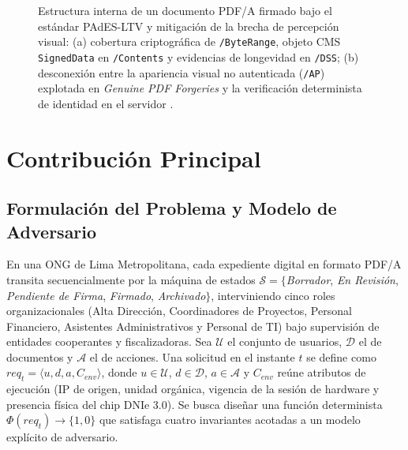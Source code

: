 \documentclass[runningheads,twocolumn]{llncs}
\begin{document}
\begin{figure}[t]
{%
}
\caption{Estructura interna de un documento PDF/A firmado bajo el estándar PAdES-LTV y mitigación de la brecha de percepción visual: (a) cobertura criptográfica de \texttt{/ByteRange}, objeto CMS \texttt{SignedData} en \texttt{/Contents} y evidencias de longevidad en \texttt{/DSS}; (b) desconexión entre la apariencia visual no autenticada (\texttt{/AP}) explotada en \textit{Genuine PDF Forgeries} y la verificación determinista de identidad en el servidor \cite{doynov2026,heher2027}.}
\label{fig:pades_ltv_structure}
\end{figure}

\section{Contribución Principal}\label{sec:contribution}

\subsection{Formulación del Problema y Modelo de Adversario}
En una ONG de Lima Metropolitana, cada expediente digital en formato PDF/A transita secuencialmente por la máquina de estados $\mathcal{S} = \{$\textit{Borrador}, \textit{En Revisión}, \textit{Pendiente de Firma}, \textit{Firmado}, \textit{Archivado}$\}$, interviniendo cinco roles organizacionales (Alta Dirección, Coordinadores de Proyectos, Personal Financiero, Asistentes Administrativos y Personal de TI) bajo supervisión de entidades cooperantes y fiscalizadoras. Sea $\mathcal{U}$ el conjunto de usuarios, $\mathcal{D}$ el de documentos y $\mathcal{A}$ el de acciones. Una solicitud en el instante $t$ se define como $req_t = \langle u, d, a, C_{env} \rangle$, donde $u \in \mathcal{U}$, $d \in \mathcal{D}$, $a \in \mathcal{A}$ y $C_{env}$ reúne atributos de ejecución (IP de origen, unidad orgánica, vigencia de la sesión de hardware y presencia física del chip DNIe 3.0). Se busca diseñar una función determinista $\Phi(req_t) \rightarrow \{1, 0\}$ que satisfaga cuatro invariantes acotadas a un modelo explícito de adversario.
\end{document}
